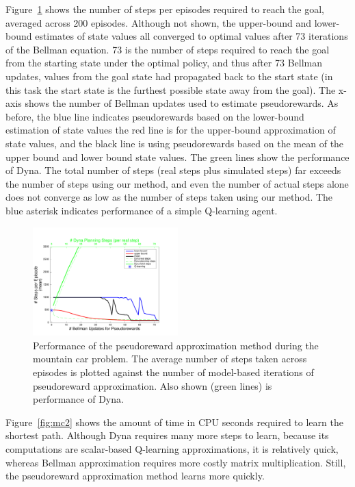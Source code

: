 \documentclass[letterpaper]{article}
\begin{document}
Figure~\ref{fig:mc1} shows the number of steps per episodes required to reach the goal, averaged across 200 episodes. Although not shown, the upper-bound and lower-bound estimates of state values all converged to optimal values after 73 iterations of the Bellman equation. 73 is the number of steps required to reach the goal from the starting state under the optimal policy, and thus after 73 Bellman updates, values from the goal state had propagated back to the start state (in this task the start state is the furthest possible state away from the goal). The x-axis shows the number of Bellman updates used to estimate pseudorewards. As before, the blue line indicates pseudorewards based on the lower-bound estimation of state values the red line is for the upper-bound approximation of state values, and the black line is using pseudorewards based on the mean of the upper bound and lower bound state values. The green lines show the performance of Dyna. The total number of steps (real steps plus simulated steps) far exceeds the number of steps using our method, and even the number of actual steps alone does not converge as low as the number of steps taken using our method. The blue asterisk indicates performance of a simple Q-learning agent.

\begin{figure}[ht]
\centering
\includegraphics[width=0.5\textwidth]{MC_learning_vs_PRiterations_DYNA_mean}
\caption{Performance of the pseudoreward approximation method during the mountain car problem. The average number of steps taken across episodes is plotted against the number of model-based iterations of pseudoreward approximation. Also shown (green lines) is performance of Dyna.}
\label{fig:mc1}
\end{figure}

Figure~\ref{fig:mc2} shows the amount of time in CPU seconds required to learn the shortest path. Although Dyna requires many more steps to learn, because its computations are scalar-based Q-learning approximations, it is relatively quick, whereas Bellman approximation requires more costly matrix multiplication. Still, the pseudoreward approximation method learns more quickly.
\end{document}

